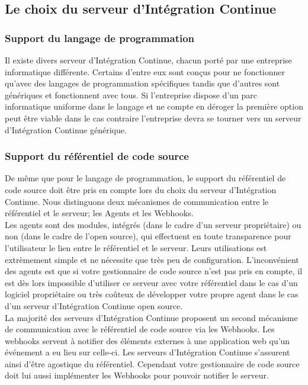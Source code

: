     \subsection{Le choix du serveur d’Intégration Continue}

      \subsubsection{Support du langage de programmation}
      Il existe divers serveur d'Intégration Continue, chacun porté par une entreprise informatique différente. Certains d'entre eux sont conçus pour ne fonctionner qu'avec des langages de programmation spécifiques tandis que d'autres sont génériques et fonctionnent avec tous. Si l'entreprise dispose d'un parc informatique uniforme dans le langage et ne compte en déroger la première option peut être viable dans le cas contraire l'entreprise devra se tourner vers un serveur d'Intégration Continue générique.

      \subsubsection{Support du référentiel de code source}
      De même que pour le langage de programmation, le support du référentiel de code source doit être pris en compte lors du choix du serveur d'Intégration Continue. Nous distinguons deux mécanismes de communication entre le référentiel et le serveur; les Agents et les Webhooks.\\

      Les agents sont des modules, intégrés (dans le cadre d'un serveur propriétaire) ou non (dans le cadre de l'open source), qui effectuent en toute transparence pour l'utilisateur le lien entre le référentiel et le serveur. Leurs utilisations est extrèmement simple et ne nécessite que très peu de configuration. L'inconvénient des agents est que si votre gestionnaire de code source n'est pas pris en compte, il est dès lors impossible d'utiliser ce serveur avec votre référentiel dans le cas d'un logiciel propriétaire ou très coûteux de développer votre propre agent dans le cas d'un serveur d'Intégration Continue open source.\\

      La majorité des serveurs d'Intégration Continue proposent un second mécanisme de communication avec le référentiel de code source via les Webhooks. Les webhooks servent à notifier des éléments externes à une application web qu'un événement a eu lieu sur celle-ci. Les serveurs d'Intégration Continue s'assurent ainsi d'être agostique du référentiel. Cependant votre gestionnaire de code source doit lui aussi implémenter les Webhooks pour pouvoir notifier le serveur.

